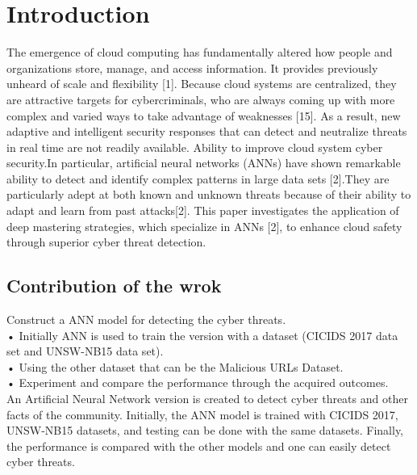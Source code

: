 \documentclass{llncs}
\begin{document}
\section{Introduction}
The emergence of cloud computing has fundamentally altered how people and organizations store, manage, and access information. It provides previously unheard of scale and flexibility [1]. Because cloud systems are centralized, they are attractive targets for cybercriminals, who are always coming up with more complex and varied ways to take advantage of weaknesses [15]. As a result, new adaptive and intelligent security responses that can detect and neutralize threats in real time are not readily available. Ability to improve cloud system cyber security.In particular, artificial neural networks (ANNs) have shown remarkable ability to detect and identify complex patterns in large data sets [2].They are particularly adept at both known and unknown threats because of their ability to adapt and learn from past attacks[2]. This paper investigates the application of deep mastering strategies, which specialize in ANNs [2], to enhance cloud safety through superior cyber threat detection.
\subsection{Contribution of the wrok}
Construct a ANN model for detecting the cyber threats. \\
• Initially ANN is used to train the version with a dataset (CICIDS 2017 data set and UNSW-NB15 data set). \\
• Using the other dataset that can be the Malicious URLs Dataset.\\
• Experiment and compare the performance through the acquired outcomes. \\
An Artificial Neural Network version is created to detect cyber threats and other facts of the community. Initially, the ANN model is trained with CICIDS 2017, UNSW-NB15 datasets, and testing can be done with the same datasets. Finally, the performance is compared with the other models and one can easily detect cyber threats. 
\end{document}
